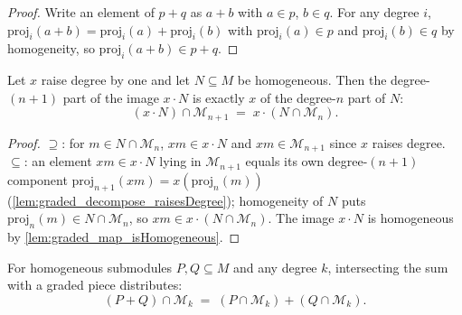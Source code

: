 \begin{proof}
  \leanok
  Write an element of \(p + q\) as \(a + b\) with \(a \in p\), \(b \in q\). For any
  degree \(i\), \(\mathrm{proj}_i(a+b) = \mathrm{proj}_i(a) + \mathrm{proj}_i(b)\)
  with \(\mathrm{proj}_i(a) \in p\) and \(\mathrm{proj}_i(b) \in q\) by homogeneity,
  so \(\mathrm{proj}_i(a+b) \in p + q\).
\end{proof}

\begin{lemma}
  \label{lem:graded_map_inf_degree_eq}
  Let \(x\) raise degree by one and let \(N \subseteq M\) be homogeneous. Then the
  degree-\((n+1)\) part of the image \(x \cdot N\) is exactly \(x\) of the
  degree-\(n\) part of \(N\):
  \[
    (x \cdot N) \cap \mathcal{M}_{n+1} \;=\; x \cdot (N \cap \mathcal{M}_n) .
  \]
\end{lemma}

\begin{proof}
  \leanok
  \(\supseteq\): for \(m \in N \cap \mathcal{M}_n\), \(x m \in x \cdot N\) and \(x m
  \in \mathcal{M}_{n+1}\) since \(x\) raises degree. \(\subseteq\): an element \(x m
  \in x \cdot N\) lying in \(\mathcal{M}_{n+1}\) equals its own degree-\((n+1)\)
  component \(\mathrm{proj}_{n+1}(x m) = x(\mathrm{proj}_n(m))\)
  (\cref{lem:graded_decompose_raisesDegree}); homogeneity of \(N\) puts
  \(\mathrm{proj}_n(m) \in N \cap \mathcal{M}_n\), so \(x m \in x \cdot (N \cap
  \mathcal{M}_n)\). The image \(x \cdot N\) is homogeneous by
  \cref{lem:graded_map_isHomogeneous}.
\end{proof}

\begin{lemma}
  \label{lem:graded_sup_inf_degree_eq}
  For homogeneous submodules \(P, Q \subseteq M\) and any degree \(k\), intersecting
  the sum with a graded piece distributes:
  \[
    (P + Q) \cap \mathcal{M}_k \;=\; (P \cap \mathcal{M}_k) + (Q \cap \mathcal{M}_k) .
  \]
\end{lemma}

